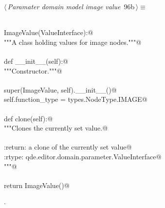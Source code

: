 \documentclass[
    a4paper,      %
    10pt,         %
    openright,    %
    notitlepage,  %
    parskip=half, %
]{scrreprt}       %
\theoremstyle{definition}                    %
\begin{document}
\begin{flushleft} \small
\begin{minipage}{\linewidth}\label{scrap154}\raggedright\small
{} $\langle\,${\itshape Paramater domain model image value}\nobreak\ {\footnotesize {96b}}$\,\rangle\equiv$
\vspace{-1exm}
\begin{list}{}{} \item
\mbox{}\lstinline@@\\
\mbox{}\lstinline@class ImageValue(ValueInterface):@\\
\mbox{}\lstinline@    """A class holding values for image nodes."""@\\
\mbox{}\lstinline@@\\
\mbox{}\lstinline@    def __init__(self):@\\
\mbox{}\lstinline@        """Constructor."""@\\
\mbox{}\lstinline@@\\
\mbox{}\lstinline@        super(ImageValue, self).__init__()@\\
\mbox{}\lstinline@        self.function_type = types.NodeType.IMAGE@\\
\mbox{}\lstinline@@\\
\mbox{}\lstinline@    def clone(self):@\\
\mbox{}\lstinline@        """Clones the currently set value.@\\
\mbox{}\lstinline@@\\
\mbox{}\lstinline@        :return: a clone of the currently set value@\\
\mbox{}\lstinline@        :rtype:  qde.editor.domain.parameter.ValueInterface@\\
\mbox{}\lstinline@        """@\\
\mbox{}\lstinline@@\\
\mbox{}\lstinline@        return ImageValue()@{\NWsep}
\end{list}
\vspace{-1.5ex}
\footnotesize
\begin{list}{}{\setlength{\itemsep}{-\parsep}\setlength{\itemindent}{-\leftmargin}}
\item {\NWtxtMacroNoRef}.

\item{}
\end{list}
\end{minipage}\vspace{4ex}
\end{flushleft}
\end{document}
